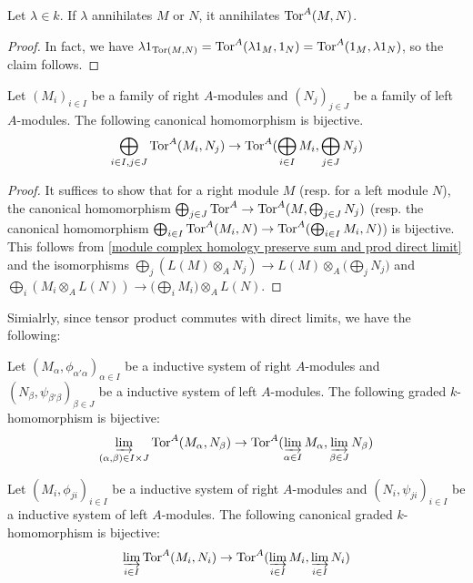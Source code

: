 \begin{corollary}\label{module twisted product annihilator prop}
Let $\lambda\in k$. If $\lambda$ annihilates $M$ or $N$, it annihilates $\mathrm{Tor}^A(M,N)$.
\end{corollary}
\begin{proof}
In fact, we have $\lambda 1_{\mathrm{Tor}(M,N)}=\mathrm{Tor}^A(\lambda 1_M,1_N)=\mathrm{Tor}^A(1_M,\lambda 1_N)$, so the claim follows.
\end{proof}
\begin{proposition}\label{module twisted product and direct sum}
Let $(M_i)_{i\in I}$ be a family of right $A$-modules and $(N_j)_{j\in J}$ be a family of left $A$-modules. The following canonical homomorphism is bijective.
\[\bigoplus_{i\in I,j\in J}\mathrm{Tor}^A(M_i,N_j)\to\mathrm{Tor}^A(\bigoplus_{i\in I}M_i,\bigoplus_{j\in J}N_j)\]
\end{proposition}
\begin{proof}
It suffices to show that for a right module $M$ (resp. for a left module $N$), the canonical homomorphism $\bigoplus_{j\in J}\mathrm{Tor}^A\to\mathrm{Tor}^A(M,\bigoplus_{j\in J}N_j)$ (resp. the canonical homomorphism $\bigoplus_{i\in I}\mathrm{Tor}^A(M_i,N)\to\mathrm{Tor}^A(\bigoplus_{i\in I}M_i,N)$) is bijective. This follows from \cref{module complex homology preserve sum and prod direct limit} and the isomorphisms $\bigoplus_j(L(M)\otimes_AN_j)\to L(M)\otimes_A\big(\bigoplus_jN_j\big)$ and $\bigoplus_i(M_i\otimes_AL(N))\to\big(\bigoplus_iM_i\big)\otimes_AL(N)$.
\end{proof}
Simialrly, since tensor product commutes with direct limits, we have the following:
\begin{proposition}\label{module twisted product and direct limit}
Let $(M_\alpha,\phi_{\alpha'\alpha})_{\alpha\in I}$ be a inductive system of right $A$-modules and $(N_\beta,\psi_{\beta'\beta})_{\beta\in J}$ be a inductive system of left $A$-modules. The following graded $k$-homomorphism is bijective:
\[\varinjlim_{(\alpha,\beta)\in I\times J}\mathrm{Tor}^A(M_\alpha,N_\beta)\to\mathrm{Tor}^A(\varinjlim_{\alpha\in I}M_\alpha,\varinjlim_{\beta\in J}N_\beta)\]
\end{proposition}
\begin{corollary}
Let $(M_i,\phi_{ji})_{i\in I}$ be a inductive system of right $A$-modules and $(N_i,\psi_{ji})_{i\in I}$ be a inductive system of left $A$-modules. The following canonical graded $k$-homomorphism is bijective:
\[\varinjlim_{i\in I}\mathrm{Tor}^A(M_i,N_i)\to\mathrm{Tor}^A(\varinjlim_{i\in I}M_i,\varinjlim_{i\in I}N_i)\]
\end{corollary}
